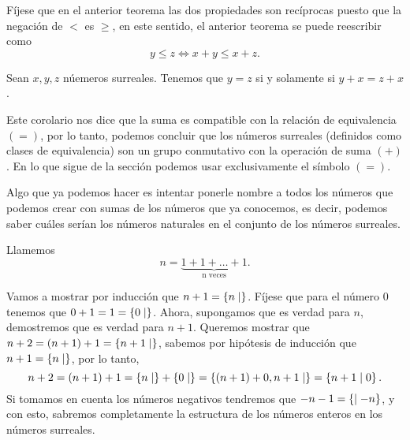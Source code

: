     F\'ijese que en el anterior teorema las dos propiedades son rec\'iprocas puesto que la negaci\'on de $<$ es $\ge$, en este sentido, el anterior teorema se puede reescribir como 
    \[
        y \le z \Leftrightarrow x+y\le x+z.
    \]

    \begin{corollary}
        Sean $x, y, z$ n\'uemeros surreales. Tenemos que $y=z$ si y solamente si $y+x=z+x$.
    \end{corollary}

    Este corolario nos dice que la suma es compatible con la relaci\'on de equivalencia $(=)$, por lo tanto, podemos concluir que los n\'umeros surreales (definidos como clases de equivalencia) son un grupo conmutativo con la operaci\'on de suma $(+)$. En lo que sigue de la secci\'on podemos usar exclusivamente el s\'imbolo $(=)$.
    
    Algo que ya podemos hacer es intentar ponerle nombre a todos los n\'umeros que podemos crear con sumas de los n\'umeros que ya conocemos, es decir, podemos saber cu\'ales ser\'ian los n\'umeros naturales en el conjunto de los n\'umeros surreales.

    \begin{example}
        Llamemos 
        \[
            n = \underbrace{1+1+\dots+1}_{\text{n veces}}.
        \]

        Vamos a mostrar por inducci\'on que $n+1 = \left\{n\mid \right\}$. F\'ijese que para el n\'umero $0$ tenemos que $0+1 = 1 = \left\{0\mid \right\}$. Ahora, supongamos que es verdad para $n$, demostremos que es verdad para $n+1$. Queremos mostrar que $n+2 = (n+1)+1 = \left\{n+1\mid \right\}$, sabemos por hip\'otesis de inducci\'on que $n+1 = \left\{n\mid \right\}$, por lo tanto,
        \[
            n+2 = (n+1)+1 = \left\{n\mid \right\} + \left\{0\mid \right\} = \left\{(n+1)+0, n+1\mid \right\} = \left\{n+1\mid 0\right\}.
        \]
        Si tomamos en cuenta los n\'umeros negativos tendremos que $-n-1 = \left\{\mid -n\right\}$, y con esto, sabremos completamente la estructura de los n\'umeros enteros en los n\'umeros surreales.
    \end{example}

